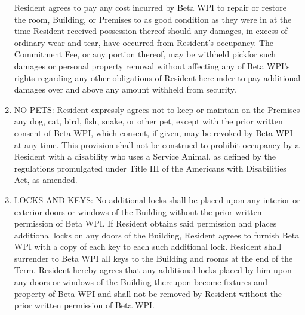 \documentclass[legalpaper, 12pt]{article}
\begin{document}
\begin{enumerate}
                Resident agrees to pay any cost incurred by Beta WPI to repair
                or restore the room, Building, or Premises to as good condition
                as they were in at the time Resident received possession
                thereof should any damages, in excess of ordinary wear and
                tear, have occurred from Resident’s occupancy.  The Commitment
                Fee, or any portion thereof, may be withheld pickfor such
                damages or personal property removal without affecting any of
                Beta WPI’s rights regarding any other obligations of Resident
                hereunder to pay additional damages over and above any amount
                withheld from security.

        \item\label{itm:pets} NO PETS\@:  Resident expressly agrees not to keep
                or maintain on the Premises any dog, cat, bird, fish, snake, or
                other pet, except with the prior written consent of Beta WPI,
                which consent, if given, may be revoked by Beta WPI at any
                time.  This provision shall not be construed to prohibit
                occupancy by a Resident with a disability who uses a Service
                Animal, as defined by the regulations promulgated under Title
                III of the Americans with Disabilities Act, as amended.

        \item\label{itm:locks} LOCKS AND KEYS\@: No additional locks shall be
                placed upon any interior or exterior doors or windows of the
                Building without the prior written permission of Beta WPI\@.
                If Resident obtains said permission and places additional locks
                on any doors of the Building, Resident agrees to furnish Beta
                WPI with a copy of each key to each such additional lock.
                Resident shall surrender to Beta WPI all keys to the Building
                and rooms at the end of the Term.  Resident hereby agrees that
                any additional locks placed by him upon any doors or windows of
                the Building thereupon become fixtures and property of Beta WPI
                and shall not be removed by Resident without the prior written
                permission of Beta WPI\@.


\end{enumerate}
\end{document}
